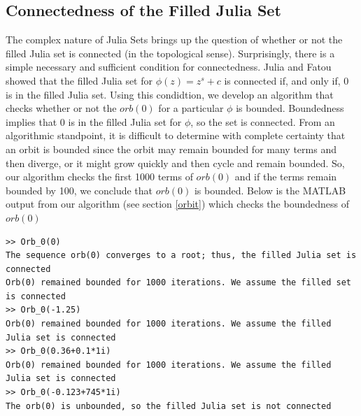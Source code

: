 \documentclass[12pt]{article}
\begin{document}
\subsection{Connectedness of the Filled Julia Set}
The complex nature of Julia Sets brings up the question of whether or not the filled Julia set is connected (in the topological sense). Surprisingly, there is a simple necessary and sufficient condition for connectedness. Julia and Fatou showed that the filled Julia set for $\phi(z)=z^s+c$ is connected if, and only if, $0$ is in the filled Julia set. Using this condidtion, we develop an algorithm that checks whether or not the $orb(0)$ for a particular $\phi$ is bounded. Boundedness implies that $0$ is in the filled Julia set for $\phi$, so the set is connected. From an algorithmic standpoint, it is difficult to determine with complete certainty that an orbit is bounded since the orbit may remain bounded for many terms and then diverge, or it might grow quickly and then cycle and remain bounded. So, our algorithm checks the first 1000 terms of $orb(0)$ and if the terms remain bounded by 100, we conclude that $orb(0)$ is bounded. Below is the MATLAB output from our algorithm (see section \ref{orbit}) which checks the boundedness of $orb(0)$
\begin{verbatim}
>> Orb_0(0)
The sequence orb(0) converges to a root; thus, the filled Julia set is connected 
Orb(0) remained bounded for 1000 iterations. We assume the filled set is connected 
>> Orb_0(-1.25)
Orb(0) remained bounded for 1000 iterations. We assume the filled Julia set is connected 
>> Orb_0(0.36+0.1*1i)
Orb(0) remained bounded for 1000 iterations. We assume the filled Julia set is connected 
>> Orb_0(-0.123+745*1i)
The orb(0) is unbounded, so the filled Julia set is not connected 
\end{verbatim}
   
\end{document}
